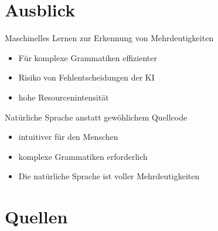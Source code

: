 \documentclass[t]{beamer}
\begin{document}
	\section{Ausblick}\label{sec:ausblick-und-zukunftige-projekte}
	\vspace{1em}
	\begin{frame}
		\begin{block}{Maschinelles Lernen zur Erkennung von Mehrdeutigkeiten}
			\begin{itemize}
				\item Für komplexe Grammatiken effizienter
				\item Risiko von Fehlentscheidungen der KI
				\item hohe Resourcenintensität
			\end{itemize}
		\end{block}
		\vspace{1em}
		\begin{block}{Natürliche Sprache anstatt gewöhlichem Quellcode}
			\begin{itemize}
				\item intuitiver für den Menschen
				\item komplexe Grammatiken erforderlich
				\item Die natürliche Sprache ist voller Mehrdeutigkeiten
			\end{itemize}
		\end{block}
	\end{frame}


	\section{Quellen}\label{sec:quellen}
	\begin{frame}[allowframebreaks]
		
		
	\end{frame}
\end{document}
